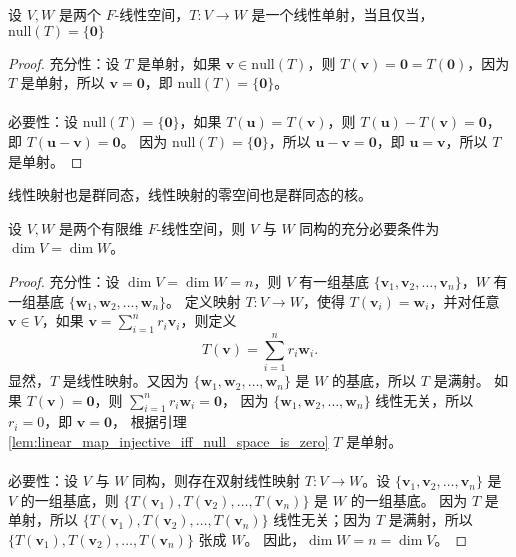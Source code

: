 \begin{lemma}
    设 $V,W$ 是两个 $F$-线性空间，$T:V\to W$ 是一个线性单射，当且仅当，$\mathrm{null}(T) = \{\mathbf{0}\}$
    \label{lem:linear_map_injective_iff_null_space_is_zero}
\end{lemma}
\begin{proof}
    充分性：设 $T$ 是单射，如果 $\mathbf{v}\in \mathrm{null}(T)$，则 $T(\mathbf{v}) = \mathbf{0} = T(\mathbf{0})$，因为 $T$ 是单射，所以 $\mathbf{v} = \mathbf{0}$，即 $\mathrm{null}(T) = \{\mathbf{0}\}$。
    \\
    \\
    必要性：设 $\mathrm{null}(T) = \{\mathbf{0}\}$，如果 $T(\mathbf{u}) = T(\mathbf{v})$，则 $T(\mathbf{u}) - T(\mathbf{v}) = \mathbf{0}$，即 $T(\mathbf{u}-\mathbf{v}) = \mathbf{0}$。
    因为 $\mathrm{null}(T) = \{\mathbf{0}\}$，所以 $\mathbf{u}-\mathbf{v} = \mathbf{0}$，即 $\mathbf{u} = \mathbf{v}$，所以 $T$ 是单射。
\end{proof}
\begin{note}
    线性映射也是群同态，线性映射的零空间也是群同态的核。
\end{note}
\vspace{0.5em}

\begin{theorem}[有限维线性空间同构的充要条件]
    设 $V,W$ 是两个有限维 $F$-线性空间，则 $V$ 与 $W$ 同构的充分必要条件为 $\dim V = \dim W$。
    \label{thm:finite_dimensional_linear_space_isomorphism}
\end{theorem}

\begin{proof}
    充分性：设 $\dim V = \dim W = n$，则 $V$ 有一组基底 $\{\mathbf{v}_1,\mathbf{v}_2,\ldots,\mathbf{v}_n\}$，$W$ 有一组基底 $\{\mathbf{w}_1,\mathbf{w}_2,\ldots,\mathbf{w}_n\}$。
    定义映射 $T:V\to W$，使得 $T(\mathbf{v}_i) = \mathbf{w}_i$，并对任意 $\mathbf{v}\in V$，如果 $\mathbf{v} = \sum_{i=1}^{n} r_i \mathbf{v}_i$，则定义
    \[
        T(\mathbf{v}) = \sum_{i=1}^{n} r_i \mathbf{w}_i.
    \]
    显然，$T$ 是线性映射。又因为 $\{\mathbf{w}_1,\mathbf{w}_2,\ldots,\mathbf{w}_n\}$ 是 $W$ 的基底，所以 $T$ 是满射。
    如果 $T(\mathbf{v}) = \mathbf{0}$，则 $\sum_{i=1}^{n} r_i \mathbf{w}_i = \mathbf{0}$，
    因为 $\{\mathbf{w}_1,\mathbf{w}_2,\ldots,\mathbf{w}_n\}$ 线性无关，所以 $r_i = 0$，即 $\mathbf{v} = \mathbf{0}$，
    根据引理 \ref{lem:linear_map_injective_iff_null_space_is_zero} $T$ 是单射。
    \\
    \\
    必要性：设 $V$ 与 $W$ 同构，则存在双射线性映射 $T:V\to W$。设 $\{\mathbf{v}_1,\mathbf{v}_2,\ldots,\mathbf{v}_n\}$ 是 $V$ 的一组基底，则 $\{T(\mathbf{v}_1),T(\mathbf{v}_2),\ldots,T(\mathbf{v}_n)\}$ 是 $W$ 的一组基底。
    因为 $T$ 是单射，所以 $\{T(\mathbf{v}_1),T(\mathbf{v}_2),\ldots,T(\mathbf{v}_n)\}$ 线性无关；因为 $T$ 是满射，所以 $\{T(\mathbf{v}_1),T(\mathbf{v}_2),\ldots,T(\mathbf{v}_n)\}$ 张成 $W$。
    因此，$\dim W = n = \dim V$。
\end{proof}


